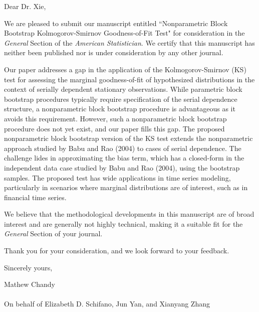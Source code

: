 \documentclass[12pt]{article}
\begin{document}

\bigskip

Dear Dr. Xie,

We are pleased to submit our manuscript entitled 
``Nonparametric Block Bootstrap Kolmogorov-Smirnov Goodness-of-Fit
Test"  for consideration in the \emph{General} Section of the
\textit{American Statistician}. We certify that this manuscript has
neither been published nor is under consideration by any other
journal.


Our paper addresses a gap in the application of the Kolmogorov-Smirnov
(KS) test for assessing the marginal goodness-of-fit of hypothesized
distributions in the context of serially dependent stationary
observations. While parametric block bootstrap procedures typically
require specification of the serial dependence structure, a
nonparametric block bootstrap procedure is advantageous as it avoids
this requirement. However, such a nonparametric block bootstrap procedure does 
not yet exist, and our paper fills this gap. The proposed nonparametric block 
bootstrap version of the KS test extends the nonparametric approach studied by 
Babu and Rao (2004) to cases of serial dependence. The challenge lides
in approximating the bias term, which has a closed-form in the
independent data case studied by Babu and Rao (2004), using the
bootstrap samples. The proposed test has wide
applications in time series modeling, particularly in scenarios where
marginal distributions are of interest, such as in financial time series.


We believe that the methodological developments in this manuscript are
of broad interest and are generally not highly technical, making it a
suitable fit for the \emph{General} Section of your journal.


Thank you for your consideration, and we look forward to your feedback.


\bigskip

Sincerely yours,

\vspace{2cm}

Mathew Chandy\\ \\On behalf of Elizabeth D. Schifano, Jun Yan, and 
Xianyang Zhang
\end{document}
